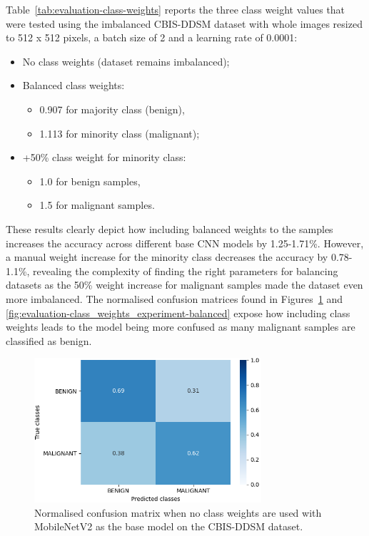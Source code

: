 Table~\ref{tab:evaluation-class-weights} reports the three class weight values that were tested using the imbalanced CBIS-DDSM dataset with whole images resized to 512 x 512 pixels, a batch size of 2 and a learning rate of 0.0001:
\begin{itemize}
    \item No class weights (dataset remains imbalanced);
    \item Balanced class weights:
    \begin{itemize}
        \item 0.907 for majority class (benign),
        \item 1.113 for minority class (malignant);
    \end{itemize}
    \item +50\% class weight for minority class:
    \begin{itemize}
        \item 1.0 for benign samples,
        \item 1.5 for malignant samples.
    \end{itemize}
\end{itemize}



These results clearly depict how including balanced weights to the samples increases the accuracy across different base CNN models by 1.25-1.71\%. However, a manual weight increase for the minority class decreases the accuracy by 0.78-1.1\%, revealing the complexity of finding the right parameters for balancing datasets as the 50\% weight increase for malignant samples made the dataset even more imbalanced. The normalised confusion matrices found in Figures~\ref{fig:evaluation-class_weights_experiment-none} and \ref{fig:evaluation-class_weights_experiment-balanced} expose how including class weights leads to the model being more confused as many malignant samples are classified as benign.

\begin{figure}[H]
\centerline{\includegraphics[width=0.75\textwidth]{figures/evaluation/class_weights_experiment/none.png}}
\caption{\label{fig:evaluation-class_weights_experiment-none}Normalised confusion matrix when no class weights are used with MobileNetV2 as the base model on the CBIS-DDSM dataset.}
\end{figure}

